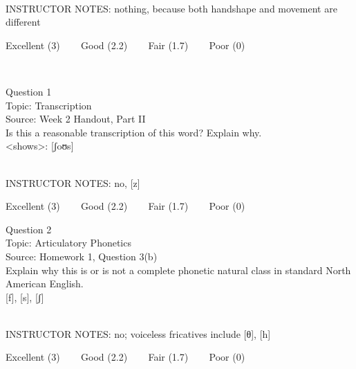 \documentclass[12pt]{article}
\begin{document}
~\\
INSTRUCTOR NOTES: nothing, because both handshape and movement are different


\vfill
Excellent (3) ~~~ Good (2.2) ~~~ Fair (1.7) ~~~ Poor (0)
\newpage

\begin{center}
\textbf{{\color{red}{\HUGE END OF EXAM}}}\\

\end{center}
\newpage

\begin{center}
\textbf{{\color{blue}{\HUGE START OF EXAM\\}}}

\textbf{{\color{blue}{\HUGE Student ID: 23000\\}}}

\textbf{{\color{blue}{\HUGE \\}}}

\end{center}
\newpage

{\large Question 1}\\

Topic: Transcription\\
Source: Week 2 Handout, Part II\\

Is this a reasonable transcription of this word? Explain why.\\

<shows>: {[ʃoʊs]}


~\\
INSTRUCTOR NOTES: no, [z]


\vfill
Excellent (3) ~~~ Good (2.2) ~~~ Fair (1.7) ~~~ Poor (0)
\newpage

{\large Question 2}\\

Topic: Articulatory Phonetics\\
Source: Homework 1, Question 3(b)\\

Explain why this is or is not a complete phonetic natural class in standard North American English.\\

{[f]}, {[s]}, {[ʃ]}


~\\
INSTRUCTOR NOTES: no; voiceless fricatives include [θ], [h]


\vfill
Excellent (3) ~~~ Good (2.2) ~~~ Fair (1.7) ~~~ Poor (0)
\newpage
\end{document}
